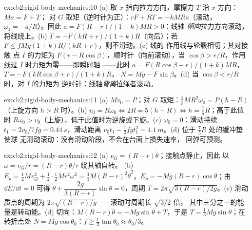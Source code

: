 \begin{solution}{exo:b2:rigid-body-mechanics:10}
(a) 取 $x$ 指向拉力方向，摩擦力 $T$ 沿 $x$ 方向：$Ma = F + T$；
对 $G$ 取矩（逆时针为正）：$rF + RT = -kMRa$（滚动，$\omega_z
= -a/R$）。因此 $a = F(R - r)/(1 + k)MR > 0$：线轴
\emph{朝向}拉力方向滚动，将线绕上。(b) $T = -F(kR + r)/(1 +
k)R$（向后）；若 $F \le fMg(1 + k)R/(kR + r)$，则不滑动。(c) 线的
作用线与轮毂相切；其对接触
点 $I$ 的力矩为 $F(r - R\cos\beta)$，顺时针（向前滚动），当 $\cos\beta >
r/R$，作用线过 $I$ 时力矩为零——即瞬时轴
——此时 $a = F(R\cos\beta - r)/(1 + k)MR$，$T = -F(kR\cos\beta + r)/(1 + k)R$，
$N = Mg - F\sin\beta$。(d) 当 $\cos\beta < r/R$ 时，对 $I$ 的力矩为
逆时针：线轴\emph{背离}拉绳者滚动。
\end{solution}

\begin{solution}{exo:b2:rigid-body-mechanics:11}
(a) $Mv_0 = P$；对 $G$ 取矩：$\tfrac25MR^2\omega_0 = P(h - R)$（上旋方向
$h > R$ 时）。(b) $v_0 = R\omega_0 \iff 2R = 5(h - R) \iff h = \tfrac75R$；高于此值时
$R\omega_0 > v_0$（上旋），低于此值时为逆旋或下旋。(c)
$\omega_0 = 0$：滑动持续 $t_1 = 2v_0/7fg = \qty{0.44}{s}$，滑动距离 $v_0t_1 -
\tfrac12fgt_1^2 = \qty{1.1}{m}$。(d) 位于 $\tfrac75R$ 处的缓冲垫使球
无滑动滚动：没有滑动阶段，不会在台面上损失速率，
回弹可预测。
\end{solution}

\begin{solution}{exo:b2:rigid-body-mechanics:12}
(a) $v_G = (R - r)\dot\theta$；接触点静止，因此
以 $\omega = v_G/r = (R - r)\dot\theta/r$ 绕其轴自转。
(b) $E_k = \tfrac12Mv_G^2 + \tfrac12\cdot\tfrac12Mr^2\omega^2 = \tfrac34M(R - r)^2
\dot\theta^2$，$E_p = -Mg(R - r)\cos\theta$；由 $\dd E/\dd t = 0$ 可得 $\ddot\theta
+ \dfrac{2g}{3(R - r)}\sin\theta = 0$，周期 $T = 2\pi\sqrt{3(R - r)/2g}$。(c) 滑动
质点的周期为 $2\pi\sqrt{(R - r)/g}$——滚动时周期长 $\sqrt{3/2}$ 倍，
其中三分之一的能量是转动能。(d) 切向：$M(R - r)\ddot\theta =
-Mg\sin\theta + T$，于是 $T = \tfrac13Mg\sin\theta$；在转折点处
$N = Mg\cos\theta_0$：$f \ge \tfrac13\tan\theta_0 \approx \theta_0/3$。
\end{solution}

